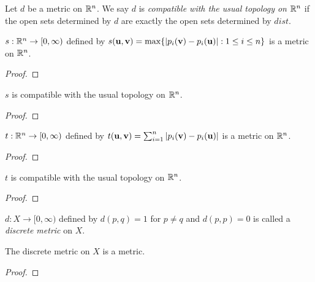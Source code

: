 \documentclass[letterpaper, twoside, 12pt]{book}
\begin{document}
\begin{definition}
  Let \(d\) be a metric on \(\mathbb R^n\). We say \(d\) is \textit{compatible
  with the usual topology on \(\mathbb R^n\)} if the open sets determined by
  \(d\) are exactly the open sets determined by \(dist\).
\end{definition}


\begin{example}
  \(s:\mathbb R^n\to[0,\infty)\) defined by
  \(s(\mathbf u,\mathbf v)=\max\{|p_i(\mathbf v)-p_i(\mathbf u)|:1\leq i\leq n\}\)
  is a metric on \(\mathbb R^n\).
\end{example}
\begin{proof}

\end{proof}

\begin{theorem}
  \(s\) is compatible with the usual topology on \(\mathbb R^n\).
\end{theorem}
\begin{proof}

\end{proof}


\begin{example}
  \(t:\mathbb R^n\to[0,\infty)\) defined by
  \(t(\mathbf u,\mathbf v)=\sum_{i=1}^n |p_i(\mathbf v)-p_i(\mathbf u)|\)
  is a metric on \(\mathbb R^n\).
\end{example}
\begin{proof}

\end{proof}

\begin{theorem}
  \(t\) is compatible with the usual topology on \(\mathbb R^n\).
\end{theorem}
\begin{proof}

\end{proof}

\begin{definition}
  \(d:X\to[0,\infty)\) defined by
  \(d(p,q)=1\) for \(p\not=q\)
  and \(d(p,p)=0\)
  is called a \textit{discrete metric} on \(X\).
\end{definition}


\begin{theorem}[12.4]
  The discrete metric on \(X\) is a metric.
\end{theorem}
\begin{proof}

\end{proof}
\end{document}
